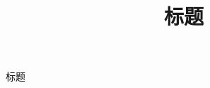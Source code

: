 \documentclass[aspectratio=169]{ctexbeamer}
\title{标题}
\author{}
\date{}
\begin{document}
\begin{frame}{标题}

\end{frame}
\end{document}
